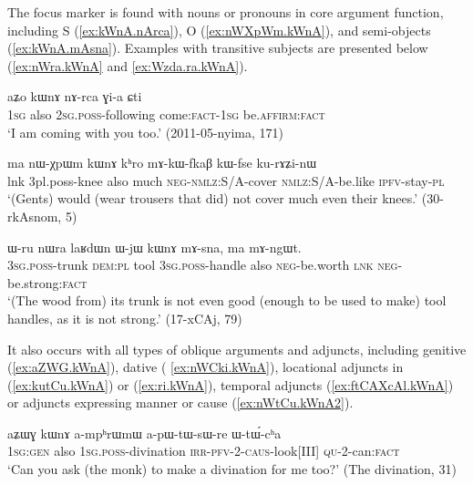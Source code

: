 The focus marker  is found with nouns or pronouns in core argument function, including S (\ref{ex:kWnA.nArca}), O (\ref{ex:nWXpWm.kWnA}), and semi-objects (\ref{ex:kWnA.mAsna}).  Examples with transitive subjects are presented below (\ref{ex:nWra.kWnA} and \ref{ex:Wzda.ra.kWnA}).

 \begin{exe}
\ex \label{ex:kWnA.nArca}
\gll aʑo kɯnɤ nɤ-rca ɣi-a ɕti  \\
\textsc{1sg} also \textsc{2sg}.\textsc{poss}-following come:\textsc{fact}-\textsc{1sg} be.\textsc{affirm}:\textsc{fact} \\
\glt `I am coming with you too.' (2011-05-nyima, 171)
 \end{exe}
 
   \begin{exe}
\ex \label{ex:nWXpWm.kWnA}
\gll    ma nɯ-χpɯm kɯnɤ kʰro mɤ-kɯ-fkaβ kɯ-fse ku-rɤʑi-nɯ  \\
lnk 3pl.poss-knee also much \textsc{neg}-\textsc{nmlz}:S/A-cover \textsc{nmlz}:S/A-be.like \textsc{ipfv}-stay-\textsc{pl} \\
\glt `(Gents) would (wear trousers that did) not cover much even their knees.'  (30-rkAsnom, 5) 
  \end{exe}
  
  \begin{exe}
 \ex \label{ex:kWnA.mAsna}
 \gll   ɯ-ru nɯra laʁdɯn ɯ-jɯ kɯnɤ mɤ-sna, ma mɤ-ngɯt. \\
 \textsc{3sg}.\textsc{poss}-trunk \textsc{dem}:\textsc{pl} tool \textsc{3sg}.\textsc{poss}-handle also \textsc{neg}-be.worth \textsc{lnk}  \textsc{neg}-be.strong:\textsc{fact} \\
 \glt `(The wood from) its trunk is not even good (enough to be used to make) tool handles, as it is not strong.'  (17-xCAj, 79)
  \end{exe}

It also occurs with all types of oblique arguments and adjuncts, including genitive (\ref{ex:aZWG.kWnA}), dative ( \ref{ex:nWCki.kWnA}),  locational adjuncts in  (\ref{ex:kutCu.kWnA}) or  (\ref{ex:ri.kWnA}), temporal adjuncts (\ref{ex:ftCAXcAl.kWnA}) or adjuncts expressing manner or cause (\ref{ex:nWtCu.kWnA2}).  
  
   \begin{exe}
\ex \label{ex:aZWG.kWnA}
\gll aʑɯɣ kɯnɤ a-mpʰrɯmɯ a-pɯ-tɯ-sɯ-re ɯ-tɯ́-cʰa \\
\textsc{1sg}:\textsc{gen} also \textsc{1sg}.\textsc{poss}-divination \textsc{irr}-\textsc{pfv}-2-\textsc{caus}-look[III] \textsc{qu}-2-can:\textsc{fact} \\
\glt `Can you ask (the monk) to make a divination for me too?' (The divination, 31)
\end{exe}  
  

